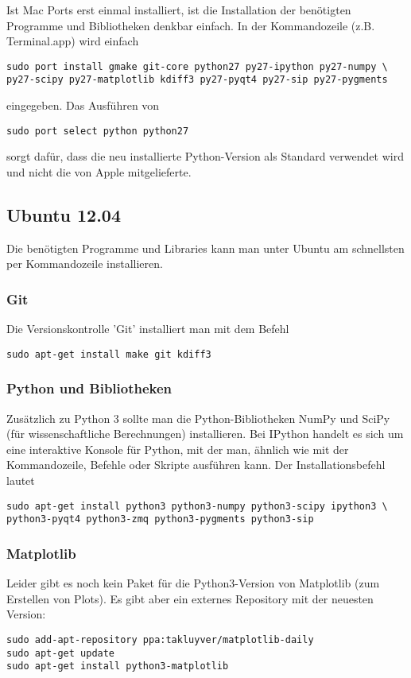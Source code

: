 Ist Mac Ports erst einmal installiert, ist die Installation der benötigten Programme und Bibliotheken denkbar einfach.
In der Kommandozeile (z.B. Terminal.app) wird einfach
\begin{verbatim}
sudo port install gmake git-core python27 py27-ipython py27-numpy \
py27-scipy py27-matplotlib kdiff3 py27-pyqt4 py27-sip py27-pygments
\end{verbatim}
eingegeben.
Das Ausführen von
\begin{verbatim}
sudo port select python python27
\end{verbatim}
sorgt dafür, dass die neu installierte Python-Version als Standard verwendet wird und nicht die von Apple mitgelieferte.

\subsection{Ubuntu 12.04}
Die benötigten Programme und Libraries kann man unter Ubuntu am schnellsten per Kommandozeile installieren.

\subsubsection{Git}
Die Versionskontrolle 'Git' installiert man mit dem Befehl
\begin{verbatim}
sudo apt-get install make git kdiff3
\end{verbatim}

\subsubsection{Python und Bibliotheken}
Zusätzlich zu Python 3 sollte man die Python-Bibliotheken NumPy und SciPy (für wissenschaftliche Berechnungen) installieren.
Bei IPython handelt es sich um eine interaktive Konsole für Python, mit der man, ähnlich wie mit der Kommandozeile, Befehle oder Skripte ausführen kann.
Der Installationsbefehl lautet
\begin{verbatim}
sudo apt-get install python3 python3-numpy python3-scipy ipython3 \
python3-pyqt4 python3-zmq python3-pygments python3-sip
\end{verbatim}

\subsubsection{Matplotlib}
Leider gibt es noch kein Paket für die Python3-Version von Matplotlib (zum Erstellen von Plots).
Es gibt aber ein externes Repository mit der neuesten Version:
\begin{verbatim}
sudo add-apt-repository ppa:takluyver/matplotlib-daily
sudo apt-get update
sudo apt-get install python3-matplotlib
\end{verbatim}

